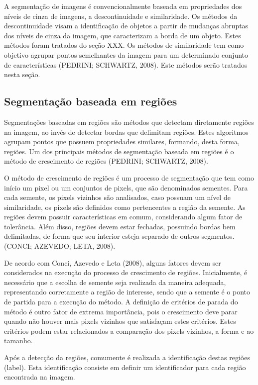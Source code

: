 \documentclass[
	12pt,				%
	oneside,			%
	a4paper,			%
	english,			%
	french,				%
	spanish,			%
	brazil,				%
	]{abntex2}
\begin{document}
A segmentação de imagens é convencionalmente baseada em propriedades dos níveis de cinza de imagens, a descontinuidade e similaridade. Os métodos da descontinuidade visam a identificação de objetos a partir de mudanças abruptas dos níveis de cinza da imagem, que caracterizam a borda de um objeto. Estes métodos foram tratados do seção XXX. Os métodos de similaridade tem como objetivo agrupar pontos semelhantes da imagem para um determinado conjunto de características (PEDRINI; SCHWARTZ, 2008). Este métodos serão tratados nesta seção.
    
\subsection{Segmentação baseada em regiões}     

Segmentações baseadas em regiões são métodos que detectam diretamente regiões na imagem, ao invés de detectar bordas que delimitam regiões. Estes algoritmos agrupam pontos que possuem propriedades similares, formando, desta forma, regiões. Um dos principais métodos de segmentação baseada em regiões é o método de crescimento de regiões (PEDRINI; SCHWARTZ, 2008).

O método de crescimento de regiões é um processo de segmentação que tem como início um pixel ou um conjuntos de pixels, que são denominados sementes. Para cada semente, os pixels vizinhos são analisados, caso possuam um nível de similaridade, os pixels são definidos como pertencentes a região da semente. As regiões devem possuir características em comum, considerando algum fator de tolerância. Além disso, regiões devem estar fechadas, possuindo bordas bem delimitadas, de forma que seu interior esteja separado de outros segmentos. (CONCI; AZEVEDO; LETA, 2008).

De acordo com Conci, Azevedo e Leta (2008), alguns fatores devem ser considerados na execução do processo de crescimento de regiões. Inicialmente, é necessário que a escolha de semente seja realizada da maneira adequada, representando corretamente a região de interesse, sendo que a semente é o ponto de partida para a execução do método. A definição de critérios de parada do método é outro fator de extrema importância, pois o crescimento deve parar quando não houver mais pixels vizinhos que satisfaçam estes critérios. Estes critérios podem estar relacionados a comparação dos pixels vizinhos, a forma e ao tamanho.

Após a detecção da regiões, comumente é realizada a identificação destas regiões (label). Esta identificação consiste em definir um identificador para cada região encontrada na imagem. 
\end{document}
